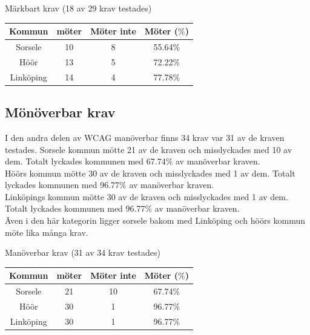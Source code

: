 \documentclass[11p]{article}
\begin{document}
    \begin{center}
    Märkbart krav (18 av 29 krav testades)

    \begin{tabular}{ |c|c|c|c|}
        \hline
        Kommun & möter & Möter inte & Möter ($\%$) \\  \hline
        Sorsele & 10 & 8 & 55.64$\%$ \\ \hline
        Höör & 13 & 5 & 72.22$\%$ \\ \hline
        Linköping & 14 & 4 & 77.78$\%$ \\ \hline
    \end{tabular}
    \end{center}

    \subsection{Mönöverbar krav}
    I den andra delen av WCAG manöverbar finns 34 krav var 31 av de kraven testades.
    Sorsele kommun mötte 21 av de kraven och misslyckades med 10 av dem.
    Totalt lyckades kommunen med 67.74$\%$ av manöverbar kraven.
    \\Höörs kommun mötte 30 av de kraven och misslyckades med 1 av dem.
    Totalt lyckades kommunen med 96.77$\%$ av manöverbar kraven.
    \\Linköpings kommun mötte 30 av de kraven och misslyckades med 1 av dem.
    Totalt lyckades kommunen med 96.77$\%$ av manöverbar kraven.
    \\Även i den här kategorin ligger sorsele bakom med Linköping och höörs kommun möte lika många krav.

    \begin{center}
    Manöverbar krav (31 av 34 krav testades)

    \begin{tabular}{ |c|c|c|c|}
        \hline
        Kommun & möter & Möter inte & Möter ($\%$) \\  \hline
        Sorsele & 21 & 10 & 67.74$\%$ \\ \hline
        Höör & 30 & 1 & 96.77$\%$ \\ \hline
        Linköping & 30 & 1 & 96.77$\%$ \\ \hline
    \end{tabular}
    \end{center}
\end{document}
